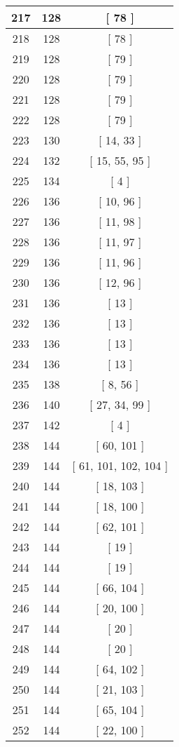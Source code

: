 \begin{center}
\begin{longtable}[H]{|| c c c ||}
\hline
217 & 128 & [ 78 ] \\ 
\hline
218 & 128 & [ 78 ] \\ 
\hline
219 & 128 & [ 79 ] \\ 
\hline
220 & 128 & [ 79 ] \\ 
\hline
221 & 128 & [ 79 ] \\ 
\hline
222 & 128 & [ 79 ] \\ 
\hline
223 & 130 & [ 14, 33 ] \\ 
\hline
224 & 132 & [ 15, 55, 95 ] \\ 
\hline
225 & 134 & [ 4 ] \\ 
\hline
226 & 136 & [ 10, 96 ] \\ 
\hline
227 & 136 & [ 11, 98 ] \\ 
\hline
228 & 136 & [ 11, 97 ] \\ 
\hline
229 & 136 & [ 11, 96 ] \\ 
\hline
230 & 136 & [ 12, 96 ] \\ 
\hline
231 & 136 & [ 13 ] \\ 
\hline
232 & 136 & [ 13 ] \\ 
\hline
233 & 136 & [ 13 ] \\ 
\hline
234 & 136 & [ 13 ] \\ 
\hline
235 & 138 & [ 8, 56 ] \\ 
\hline
236 & 140 & [ 27, 34, 99 ] \\ 
\hline
237 & 142 & [ 4 ] \\ 
\hline
238 & 144 & [ 60, 101 ] \\ 
\hline
239 & 144 & [ 61, 101, 102, 104 ] \\ 
\hline
240 & 144 & [ 18, 103 ] \\ 
\hline
241 & 144 & [ 18, 100 ] \\ 
\hline
242 & 144 & [ 62, 101 ] \\ 
\hline
243 & 144 & [ 19 ] \\ 
\hline
244 & 144 & [ 19 ] \\ 
\hline
245 & 144 & [ 66, 104 ] \\ 
\hline
246 & 144 & [ 20, 100 ] \\ 
\hline
247 & 144 & [ 20 ] \\ 
\hline
248 & 144 & [ 20 ] \\ 
\hline
249 & 144 & [ 64, 102 ] \\ 
\hline
250 & 144 & [ 21, 103 ] \\ 
\hline
251 & 144 & [ 65, 104 ] \\ 
\hline
252 & 144 & [ 22, 100 ] \\ 

\end{longtable}
\end{center}
